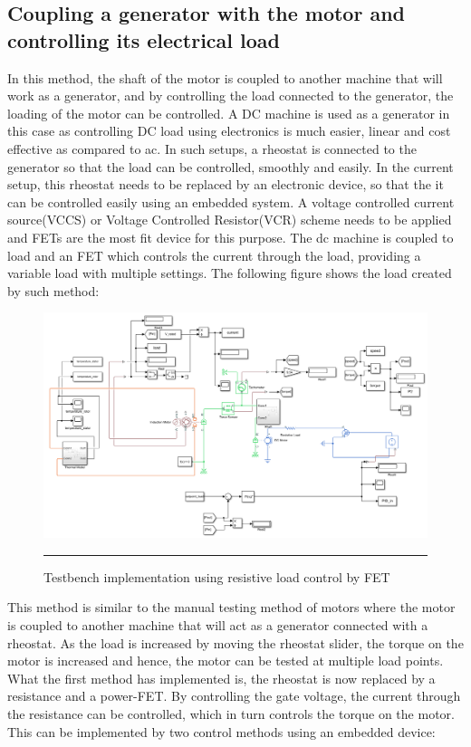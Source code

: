 \subsection{Coupling a generator with the motor and controlling its electrical load}
In this method, the shaft of the motor is coupled to another machine that will work as a generator, and by controlling the load connected to the generator, the loading of the motor can be controlled. A DC machine is used as a generator in this case as controlling DC load using electronics is much easier, linear and cost effective as compared to ac. In such setups, a rheostat is connected to the generator so that the load can be controlled, smoothly and easily. In the current setup, this rheostat needs to be replaced by an electronic device, so that the it can be controlled easily using an embedded system. A voltage controlled current source(VCCS) or Voltage Controlled Resistor(VCR) scheme needs to be applied and FETs are the most fit device for this purpose. The dc machine is coupled to load and an FET which controls the current through the load, providing a variable load with multiple settings. The following figure shows the load created by such method:
\begin{figure}[htbp]
	\centering
		\includegraphics[width = 4.5in]{./Figures/MS/fig34.png}
		\rule{35em}{0.5pt}
	\caption{Testbench implementation using resistive load control by FET}
	\label{fig:Testbench implementation using resistive load control by FET}
\end{figure}
This method is similar to the manual testing method of motors where the motor is coupled to another machine that will act as a generator connected with a rheostat. As the load is increased by moving the rheostat slider, the torque on the motor is increased and hence, the motor can be tested at multiple load points. What the first method has implemented is, the rheostat is now replaced by a resistance and a power-FET. By controlling the gate voltage, the current through the resistance can be controlled, which in turn controls the torque on the motor. This can be implemented by two control methods using an embedded device:

